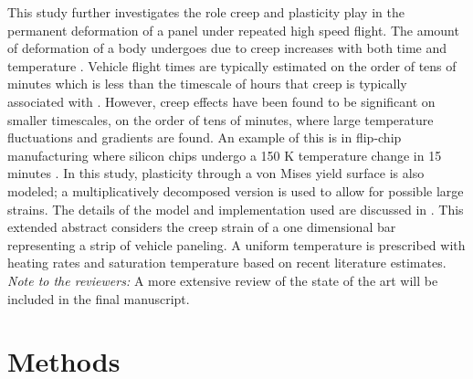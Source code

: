 \documentclass[conf]{new-aiaa}
\begin{document}
This study further investigates the role creep and plasticity play 
in the permanent deformation of a panel under repeated high speed flight.
The amount of deformation of a body undergoes due to creep increases 
with both time and temperature
\cite{roylance_mechanics_of_materials_text}. 
Vehicle flight times are typically estimated on the order
of tens of minutes 
\cite{ 
  kordes_structureal_heating_experiencs_on_the_x15_airplane,
  lafontaine_effects_of_strain_hardeing_on_response_of_skin_panels_in_hypersonic_flow,
  zuchowski_AVIATR_Predictive_capability_for_hypersonic_structural_response_and_life_prediction_phase_II}
which is less than the timescale of hours that creep is 
typically associated with 
\cite{ 
  lavina_creep_behavior_of_Ti6Al4V_from_450C_to_600C,
  evans_effects_of_alpha_case_formation_on_creep_fracture_properties_of_the_high_temperature_titanium_alloy_IMI834,
  roylance_mechanics_of_materials_text}.
However, creep effects have been found to be significant on smaller timescales,
on the order of tens of minutes,
where large temperature fluctuations and gradients are found.
An example of this is in flip-chip manufacturing 
where silicon chips undergo a 150 K temperature change 
in 15 minutes
\cite{ 
  li_simulation_of_finite_strain_inelastic_phenomena_governed_by_creep_and_plasticity}.
In this study, plasticity through a von Mises yield surface is also modeled;
a multiplicatively decomposed version is used to allow for 
possible large strains.
The details of the model and implementation used are
discussed in 
\cite{ li_simulation_of_finite_strain_inelastic_phenomena_governed_by_creep_and_plasticity}.
This extended abstract considers the creep strain of a one dimensional bar
representing a strip of vehicle paneling.
A uniform temperature is prescribed with heating rates and saturation 
temperature based on recent literature estimates.
\newline
\newline
\noindent
\emph{Note to the reviewers:} A more extensive review of the 
state of the art will be included in the 
final manuscript.

\section{Methods} \label{sec_methods} %
\end{document}
